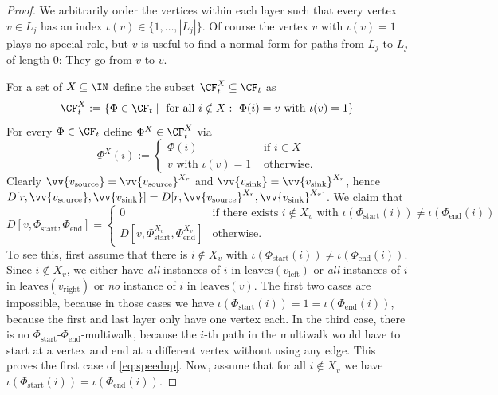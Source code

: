 \begin{proof}
We arbitrarily order the vertices within each layer such that every vertex $v \in L_j$ has an index $\iota(v) \in \{1,\ldots,|L_j|\}$. Of course the vertex $v$ with $\iota(v)=1$ plays no special role, but $v$ is useful to find a normal form for paths from $L_j$ to $L_j$ of length 0: They go from $v$ to $v$.

For a set of $X \subseteq \IN$
define the subset $\CF_{t}^{X}\subseteq \CF_{t}$ as
\[
\CF_{t}^{X} := \{\Phi \in \CF_{t} \mid \text{ for all } i \notin X: \ \Phi(i)=v \text{ with } \iota(v)=1\}
\]
For every $\Phi \in \CF_{t}$ define $\Phi^X \in \CF_{t}^X$ via
\begin{equation}\label{eq:defsupX}
\Phi^X(i) := \begin{cases}
\Phi(i) & \text{ if } i \in X \\
v \text{ with } \iota(v)=1 & \text{ otherwise}.
\end{cases}
\end{equation}
Clearly $\vv{v_{\textup{source}}}=\vv{v_{\textup{source}}}^{X_r}$ and $\vv{v_{\textup{sink}}}=\vv{v_{\textup{sink}}}^{X_r}$, hence $D[r, \vv{v_{\textup{source}}}, \vv{v_{\textup{sink}}}]=D[r, \vv{v_{\textup{source}}}^{X_r}, \vv{v_{\textup{sink}}}^{X_r}]$.
We claim that
\begin{equation}\label{eq:speedup}
D[v,\Phi_\text{start}, \Phi_\text{end}]=
\begin{cases}
0 & \text{if there exists $i \notin X_v$ with $\iota(\Phi_\text{start}(i))\neq\iota(\Phi_\text{end}(i))$} \\
D[v,\Phi_\text{start}^{X_v}, \Phi_\text{end}^{X_v}]
& \text{otherwise}.
\end{cases}
\end{equation}
To see this, first assume that there is $i \notin X_v$ with $\iota(\Phi_\text{start}(i))\neq\iota(\Phi_\text{end}(i))$.
Since $i \notin X_v$, we either have \emph{all} instances of $i$ in $\text{leaves}(v_\text{left})$ or \emph{all} instances of $i$ in $\text{leaves}(v_\text{right})$ or \emph{no} instance of $i$ in $\text{leaves}(v)$. The first two cases are impossible, because in those cases we have $\iota(\Phi_\text{start}(i))=1=\iota(\Phi_\text{end}(i))$, because the first and last layer only have one vertex each. In the third case, there is no $\Phi_\text{start}$-$\Phi_\text{end}$-multiwalk, because the $i$-th path in the multiwalk would have to start at a vertex and end at a different vertex without using any edge. This proves the first case of \eqref{eq:speedup}.
Now, assume that for all $i \notin X_v$ we have $\iota(\Phi_\text{start}(i))=\iota(\Phi_\text{end}(i))$.

\end{proof}
